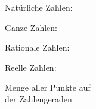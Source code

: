 Natürliche Zahlen:\medskip
{}

Ganze Zahlen:\medskip
{}

Rationale Zahlen:\medskip
{}

Reelle Zahlen:\medskip
{}
\begin{minipage}[t]{0.6\linewidth}%
Menge aller Punkte auf\hfill\\ der Zahlengeraden
\end{minipage}

